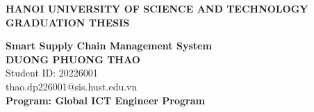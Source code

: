 \documentclass[DoAn.tex]{subfiles}
\begin{document}
\begin{titlepage}
\thispagestyle{empty}
\begin{center}

{\textbf{\large{HANOI UNIVERSITY OF SCIENCE AND TECHNOLOGY}}}\\[4cm]

{\textbf{\huge{GRADUATION THESIS}}}\\[1cm]
{\textbf{\Large{Smart Supply Chain Management System}}\\[1cm]

{\textbf{\large{DUONG PHUONG THAO}}}\\
{\large{Student ID: 20226001}}\\
{\large{thao.dp226001@sis.hust.edu.vn}}\\[0.5cm]

{\textbf{\large{Program: Global ICT Engineer Program
}}}\\

\vspace{4cm}
\begin{table}[H]
\centering
{}
\end{table}}
\end{center}



\end{titlepage}
\end{document}
